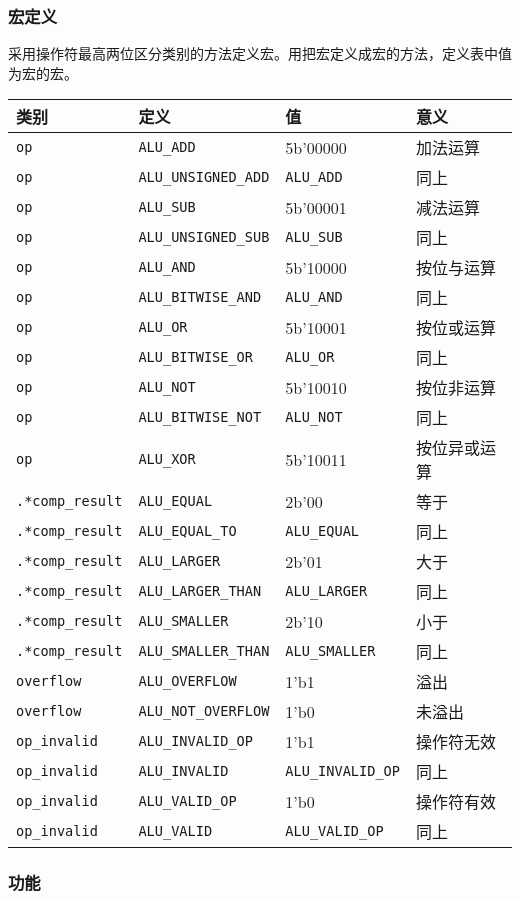 \hypertarget{ux5b8fux5b9aux4e49-5}{%
\subsubsection{宏定义}\label{ux5b8fux5b9aux4e49-5}}

采用操作符最高两位区分类别的方法定义宏。用把宏定义成宏的方法，定义表中值为宏的宏。

\begin{longtable}[]{@{}llll@{}}
\toprule
类别 & 定义 & 值 & 意义\tabularnewline
\midrule
\endhead
\texttt{op} & \texttt{ALU\_ADD} & 5b'00000 & 加法运算\tabularnewline
\texttt{op} & \texttt{ALU\_UNSIGNED\_ADD} & \texttt{ALU\_ADD} &
同上\tabularnewline
\texttt{op} & \texttt{ALU\_SUB} & 5b'00001 & 减法运算\tabularnewline
\texttt{op} & \texttt{ALU\_UNSIGNED\_SUB} & \texttt{ALU\_SUB} &
同上\tabularnewline
\texttt{op} & \texttt{ALU\_AND} & 5b'10000 & 按位与运算\tabularnewline
\texttt{op} & \texttt{ALU\_BITWISE\_AND} & \texttt{ALU\_AND} &
同上\tabularnewline
\texttt{op} & \texttt{ALU\_OR} & 5b'10001 & 按位或运算\tabularnewline
\texttt{op} & \texttt{ALU\_BITWISE\_OR} & \texttt{ALU\_OR} &
同上\tabularnewline
\texttt{op} & \texttt{ALU\_NOT} & 5b'10010 & 按位非运算\tabularnewline
\texttt{op} & \texttt{ALU\_BITWISE\_NOT} & \texttt{ALU\_NOT} &
同上\tabularnewline
\texttt{op} & \texttt{ALU\_XOR} & 5b'10011 & 按位异或运算\tabularnewline
\texttt{.*comp\_result} & \texttt{ALU\_EQUAL} & 2b'00 &
等于\tabularnewline
\texttt{.*comp\_result} & \texttt{ALU\_EQUAL\_TO} & \texttt{ALU\_EQUAL}
& 同上\tabularnewline
\texttt{.*comp\_result} & \texttt{ALU\_LARGER} & 2b'01 &
大于\tabularnewline
\texttt{.*comp\_result} & \texttt{ALU\_LARGER\_THAN} &
\texttt{ALU\_LARGER} & 同上\tabularnewline
\texttt{.*comp\_result} & \texttt{ALU\_SMALLER} & 2b'10 &
小于\tabularnewline
\texttt{.*comp\_result} & \texttt{ALU\_SMALLER\_THAN} &
\texttt{ALU\_SMALLER} & 同上\tabularnewline
\texttt{overflow} & \texttt{ALU\_OVERFLOW} & 1'b1 & 溢出\tabularnewline
\texttt{overflow} & \texttt{ALU\_NOT\_OVERFLOW} & 1'b0 &
未溢出\tabularnewline
\texttt{op\_invalid} & \texttt{ALU\_INVALID\_OP} & 1'b1 &
操作符无效\tabularnewline
\texttt{op\_invalid} & \texttt{ALU\_INVALID} & \texttt{ALU\_INVALID\_OP}
& 同上\tabularnewline
\texttt{op\_invalid} & \texttt{ALU\_VALID\_OP} & 1'b0 &
操作符有效\tabularnewline
\texttt{op\_invalid} & \texttt{ALU\_VALID} & \texttt{ALU\_VALID\_OP} &
同上\tabularnewline
\bottomrule
\end{longtable}

\hypertarget{ux529fux80fd-7}{%
\subsubsection{功能}\label{ux529fux80fd-7}}

